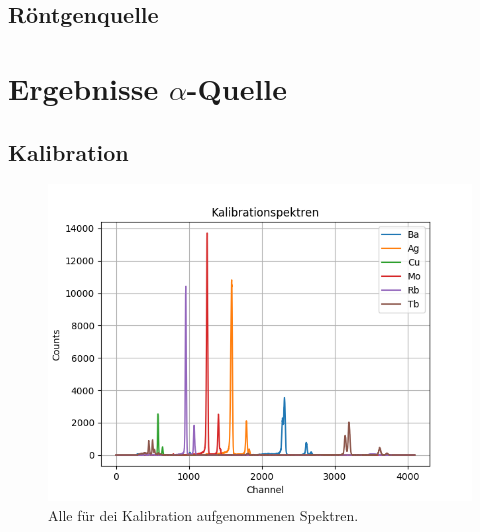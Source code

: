 \documentclass[12pt,a4paper]{article}
\begin{document}
\subsection{Röntgenquelle}

\section{Ergebnisse $\alpha$-Quelle}
\subsection{Kalibration}

\begin{figure}
\centering
\includegraphics[scale=0.9]{Bilder/alpha/kal_alles.png}
\caption{Alle für dei Kalibration aufgenommenen Spektren.}
\label{fig:kal_alles}
\end{figure}
\end{document}

